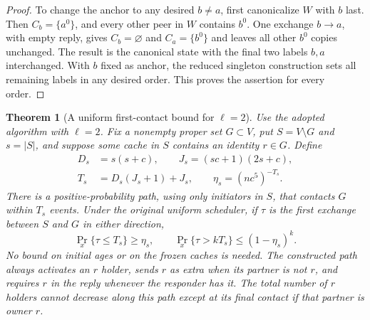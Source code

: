 \documentclass[11pt]{article}
\newtheorem{theorem}{Theorem}
\begin{document}
\begin{proof}
To change the anchor to any desired $b\ne a$, first
canonicalize $W$ with $b$ last. Then $C_b=\{a^0\}$,
and every other peer in $W$ contains $b^0$.
One exchange $b\to a$, with empty reply, gives
$C_b=\varnothing$ and $C_a=\{b^0\}$ and leaves all
other $b^0$ copies unchanged. The result is the canonical
state with the final two labels $b,a$ interchanged.
With $b$ fixed as anchor, the reduced singleton
construction sets all remaining labels in any desired
order. This proves the assertion for every order.
\end{proof}

\begin{theorem}[A uniform first-contact bound for $\ell=2$]
\label{thm:firstcontact}
Use the adopted algorithm with $\ell=2$.
Fix a nonempty proper set $G\subset V$, put $S=V\setminus G$
and $s=|S|$, and suppose some cache in $S$ contains an
identity $r\in G$. Define
\[
 \begin{split}
 D_s&=s(s+c),\qquad J_s=(sc+1)(2s+c),\\
 T_s&=D_s(J_s+1)+J_s,\qquad
 \eta_s=(nc^5)^{-T_s}.
 \end{split}
\]
There is a positive-probability path, using only initiators
in $S$, that contacts $G$ within $T_s$ events.
Under the original uniform scheduler, if $\tau$ is the
first exchange between $S$ and $G$ in either direction,
\[
 \Pr_x\{\tau\le T_s\}\ge\eta_s,\qquad
 \Pr_x\{\tau>kT_s\}\le(1-\eta_s)^k.
\]
No bound on initial ages or on the frozen caches is needed.
The constructed path always activates an $r$ holder,
sends $r$ as extra when its partner is not $r$, and
requires $r$ in the reply whenever the responder has it.
The total number of $r$ holders cannot decrease along
this path except at its final contact if that partner
is owner $r$.
\end{theorem}
\end{document}
